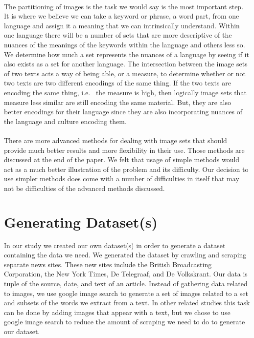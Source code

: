 \documentclass[12pt]{article}
\begin{document}
\paragraph{}
The partitioning of images is the task we would say is the most important step. It is where
we believe we can take a keyword or phrase, a word part, from one language and assign it a 
meaning that we can intrinsically understand. Within one language there will be a number of
sets that are more descriptive of the nuances of the meanings of the keywords within the
language and others less so. We determine how much a set represents the nuances of a 
language by seeing if it also exists as a set for another language. The intersection between
the image sets of two texts acts a way of being able, or a measure, to determine whether or 
not two texts are two different encodings of the same thing. If the two texts are encoding 
the same thing, i.e. \ the measure is high, then logically image sets that measure less similar
are still encoding the same material. But, they are also better encodings for their language
since they are also incorporating nuances of the language and culture encoding them.
\paragraph{}
There are more advanced methods for dealing with image sets that should provide much better
results and more flexibility in their use. Those methods are discussed at the end of the paper. 
We felt that usage of simple methods would act as a much better illustration of the problem and
its difficulty. Our decision to use simpler methods does come with a number of difficulties in
itself that may not be difficulties of the advanced methods discussed.
\section{Generating Dataset(s)}
In our study we created our own dataset(s) in order to generate a dataset containing the data we need. We generated the dataset by crawling and scraping separate news sites. These new sites include the British Broadcasting Corporation, the New York Times, De Telegraaf, and De Volkskrant. Our data is tuple of the source, date, and text of an article.
Instead of gathering data related to images, we use google image search to generate a set of images related to a set and subsets of the words we extract from a text. In other related studies this task can be done by adding images that appear with a text, but we chose to use google image search to reduce the amount of scraping we need to do to generate our dataset.
\end{document}
